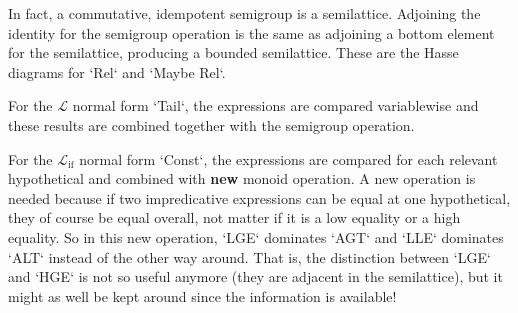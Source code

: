 \documentclass[11pt, twoside, reqno]{book}
\DeclareMathOperator{\ifop}{if}
\begin{document}
In fact, a commutative, idempotent semigroup is a semilattice.
Adjoining the identity for the semigroup operation is the same as adjoining a bottom element for the semilattice, producing a bounded semilattice.
These are the Hasse diagrams for \inHS`Rel` and \inHS`Maybe Rel`.

\hfill{}\hfill\hfill
{}\hfill\null


For the \(\mathcal{L}\) normal form \inHS`Tail`, the expressions are compared variablewise and these results are combined together with the semigroup operation.

For the \(\mathcal{L}_{\ifop}\) normal form \inHS`Const`, the expressions are compared for each relevant hypothetical and combined with \textbf{new} monoid operation.
A new operation is needed because if two impredicative expressions can be equal at one hypothetical, they of course be equal overall, not matter if it is a low equality or a high equality.
So in this new operation, \inHS`LGE` dominates \inHS`AGT` and \inHS`LLE` dominates \inHS`ALT` instead of the other way around.
That is, the distinction between \inHS`LGE` and \inHS`HGE` is not so useful anymore (they are adjacent in the semilattice), but it might as well be kept around since the information is available!
\end{document}
